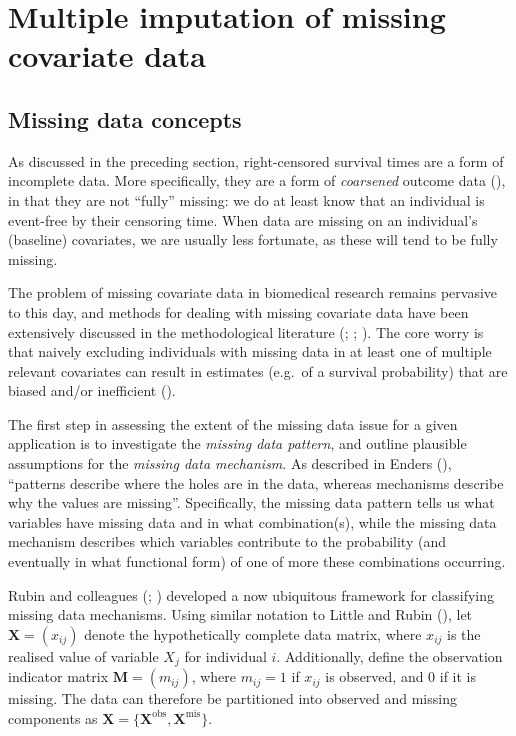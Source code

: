 \documentclass[
  letterpaper,
  DIV=11,
  numbers=noendperiod]{scrreprt}
\begin{document}
\section{Multiple imputation of missing covariate
data}\label{sec-intro-MI}

\subsection{Missing data concepts}\label{sec-miss-mechs}

As discussed in the preceding section, right-censored survival times are
a form of incomplete data. More specifically, they are a form of
\emph{coarsened} outcome data
(), in that they are not ``fully'' missing: we do at least know that
an individual is event-free by their censoring time. When data are
missing on an individual's (baseline) covariates, we are usually less
fortunate, as these will tend to be fully missing.

The problem of missing covariate data in biomedical research remains
pervasive to this day, and methods for dealing with missing covariate
data have been extensively discussed in the methodological literature
(;
;
).
The core worry is that naively excluding individuals with missing data
in at least one of multiple relevant covariates can result in estimates
(e.g.~of a survival probability) that are biased and/or inefficient
().

The first step in assessing the extent of the missing data issue for a
given application is to investigate the \emph{missing data pattern}, and
outline plausible assumptions for the \emph{missing data mechanism}. As
described in Enders (),
``patterns describe where the holes are in the data, whereas mechanisms
describe why the values are missing''. Specifically, the missing data
pattern tells us what variables have missing data and in what
combination(s), while the missing data mechanism describes which
variables contribute to the probability (and eventually in what
functional form) of one of more these combinations occurring.

Rubin and colleagues (; )
developed a now ubiquitous framework for classifying missing data
mechanisms. Using similar notation to Little and Rubin
(), let
\(\mathbf{X}=(x_{ij})\) denote the hypothetically complete data matrix,
where \(x_{ij}\) is the realised value of variable \(X_j\) for
individual \(i\). Additionally, define the observation indicator matrix
\(\mathbf{M} = (m_{ij})\), where \(m_{ij} = 1\) if \(x_{ij}\) is
observed, and 0 if it is missing. The data can therefore be partitioned
into observed and missing components as
\(\mathbf{X} = \{\mathbf{X}^{\text{obs}},\mathbf{X}^{\text{mis}}\}\).
\end{document}
